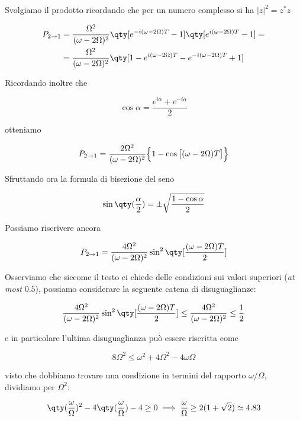 \begin{soluzione}
   Svolgiamo il prodotto ricordando che per un numero complesso si ha $|z|^2=z^*z$

   \begin{gather*}
      P_{2 \to 1}
      =\frac{\Omega^2}{(\omega - 2\Omega)^2} \qty[ e^{-i(\omega - 2\Omega)T} - 1 ] \qty[ e^{i(\omega - 2\Omega)T} - 1 ]=
      \\
      =\frac{\Omega^2}{(\omega - 2\Omega)^2} \qty[ 1 - e^{i(\omega - 2\Omega)T} - e^{-i(\omega - 2\Omega)T} + 1 ]
   \end{gather*}

   Ricordando inoltre che

   \begin{equation*}
      \cos{\alpha}=\frac{e^{i\alpha} + e^{-i\alpha}}{2}
   \end{equation*}

   otteniamo

   \begin{equation*}
      P_{2 \to 1}
      =\frac{2\Omega^2}{(\omega - 2\Omega)^2} \Bigl\{ 1 - \cos{ \bigl[ (\omega - 2\Omega) T \bigr] } \Bigr\}
   \end{equation*}

   Sfruttando ora la formula di bisezione del seno

   \begin{equation*}
      \sin{\qty( \frac{\alpha}{2} )}
      =\pm \sqrt{ \frac{1 - \cos{\alpha}}{2} }
   \end{equation*}

   Possiamo riscrivere ancora

   \begin{equation*}
      P_{2 \to 1}
      =\frac{4\Omega^2}{(\omega - 2\Omega)^2} \sin^2{ \qty[ \frac{ (\omega - 2\Omega) T }{2} ] }
   \end{equation*}

   Osserviamo che siccome il testo ci chiede delle condizioni sui valori superiori (\textit{at most} $0.5$), possiamo considerare la seguente catena di disuguaglianze:
   
   \begin{equation*}
      \frac{4\Omega^2}{(\omega - 2\Omega)^2} \sin^2{ \qty[ \frac{ (\omega - 2\Omega) T }{2} ] }
      \leq \frac{4\Omega^2}{(\omega - 2\Omega)^2}
      \leq \frac{1}{2}
   \end{equation*}

   e in particolare l'ultima disuguaglianza può essere riscritta come
   
   \begin{equation*}
      8\Omega^2 \leq \omega^2 + 4\Omega^2 - 4\omega\Omega
   \end{equation*}

   visto che dobbiamo trovare una condizione in termini del rapporto $\omega/\Omega$, dividiamo per $\Omega^2$:

   \begin{equation*}
      \qty( \frac{\omega}{\Omega} )^2 - 4\qty( \frac{\omega}{\Omega} ) - 4 \geq 0
      \implies
      \frac{\omega}{\Omega} \geq 2 ( 1 + \sqrt{2} ) \simeq 4.83
   \end{equation*}
\end{soluzione}

